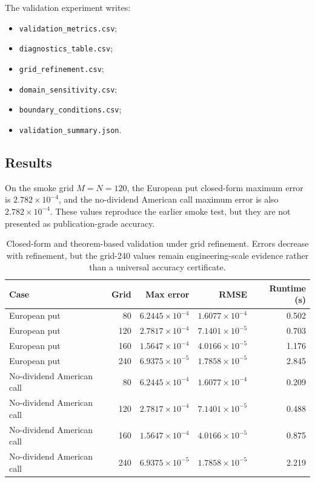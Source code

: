 \documentclass[11pt]{article}
\begin{document}
The validation experiment writes:
\begin{itemize}
  \item \texttt{validation\_metrics.csv};
  \item \texttt{diagnostics\_table.csv};
  \item \texttt{grid\_refinement.csv};
  \item \texttt{domain\_sensitivity.csv};
  \item \texttt{boundary\_conditions.csv};
  \item \texttt{validation\_summary.json}.
\end{itemize}

\subsection{Results}
On the smoke grid \(M=N=120\), the European put closed-form maximum error is
\(2.782\times10^{-4}\), and the no-dividend American call maximum error is
also \(2.782\times10^{-4}\). These values reproduce the earlier smoke test,
but they are not presented as publication-grade accuracy.

\begin{table}[h]
\centering
\begin{tabular}{lrrrr}
\toprule
Case & Grid & Max error & RMSE & Runtime (s)\\
\midrule
European put & 80 & $6.2445\times10^{-4}$ & $1.6077\times10^{-4}$ & 0.502\\
European put & 120 & $2.7817\times10^{-4}$ & $7.1401\times10^{-5}$ & 0.703\\
European put & 160 & $1.5647\times10^{-4}$ & $4.0166\times10^{-5}$ & 1.176\\
European put & 240 & $6.9375\times10^{-5}$ & $1.7858\times10^{-5}$ & 2.845\\
No-dividend American call & 80 & $6.2445\times10^{-4}$ & $1.6077\times10^{-4}$ & 0.209\\
No-dividend American call & 120 & $2.7817\times10^{-4}$ & $7.1401\times10^{-5}$ & 0.488\\
No-dividend American call & 160 & $1.5647\times10^{-4}$ & $4.0166\times10^{-5}$ & 0.875\\
No-dividend American call & 240 & $6.9375\times10^{-5}$ & $1.7858\times10^{-5}$ & 2.219\\
\bottomrule
\end{tabular}
\caption{Closed-form and theorem-based validation under grid refinement. Errors decrease with refinement, but the grid-240 values remain engineering-scale evidence rather than a universal accuracy certificate.}
\end{table}
\end{document}
